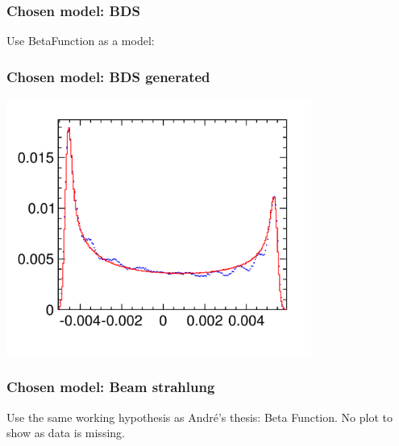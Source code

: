 \documentclass{beamer}
\begin{document}
\begin{frame}
\frametitle{Chosen model: BDS}
Use BetaFunction as a model:\\
\end{frame}
\begin{frame}
\frametitle{Chosen model: BDS generated}
\includegraphics[width=10cm]{MCBeamSpread}
\end{frame}
\begin{frame}
\frametitle{Chosen model: Beam strahlung}
Use the same working hypothesis as Andr\'e's thesis: Beta Function. No plot to
show as data is missing.
\end{frame}
\end{document}
